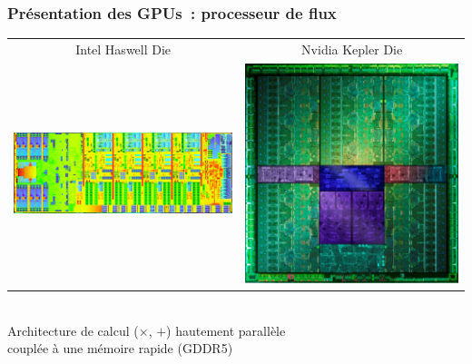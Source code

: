 \begin{frame}
  \frametitle{Présentation des GPUs~: processeur de flux}
  \begin{center}
    \begin{tabular}{cc}
      Intel Haswell Die & Nvidia Kepler Die \\[5mm]
      \includegraphics[height=.3\textheight]{images/intel-haswell-die.jpg} &
      \includegraphics[height=.3\textheight]{images/nvidia-kepler-die.jpg}
    \end{tabular} \\[5mm]
    Architecture de calcul ($\times$, $+$) hautement parallèle \\
    couplée à une mémoire rapide (GDDR5) \\
  \end{center}

\end{frame}

